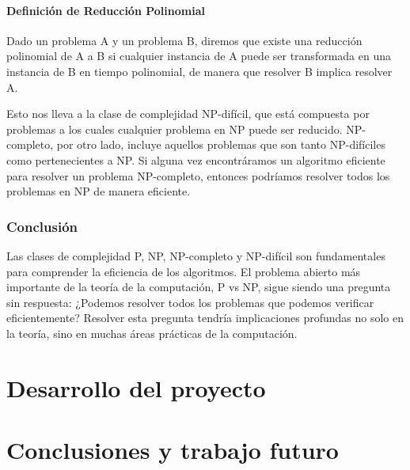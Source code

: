 \documentclass[12pt,titlepage,twoside,openright]{book}
\begin{document}
\subsubsection{Definición de Reducción Polinomial}

Dado un problema A y un problema B, diremos que existe una reducción polinomial de A a B si cualquier instancia de A puede ser transformada en una instancia de B en tiempo polinomial, de manera que resolver B implica resolver A.

Esto nos lleva a la clase de complejidad NP-difícil, que está compuesta por problemas a los cuales cualquier problema en NP puede ser reducido. NP-completo, por otro lado, incluye aquellos problemas que son tanto NP-difíciles como pertenecientes a NP. Si alguna vez encontráramos un algoritmo eficiente para resolver un problema NP-completo, entonces podríamos resolver todos los problemas en NP de manera eficiente.

\subsection{Conclusión}

Las clases de complejidad P, NP, NP-completo y NP-difícil son fundamentales para comprender la eficiencia de los algoritmos. El problema abierto más importante de la teoría de la computación, P vs NP, sigue siendo una pregunta sin respuesta: ¿Podemos resolver todos los problemas que podemos verificar eficientemente? Resolver esta pregunta tendría implicaciones profundas no solo en la teoría, sino en muchas áreas prácticas de la computación.


\chapter{Desarrollo del proyecto}

\chapter{Conclusiones y trabajo futuro}



\begin{thebibliography}{0}

\end{thebibliography}
\end{document}
